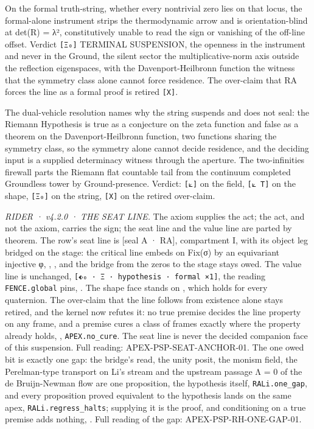 \documentclass[10pt,twocolumn]{article}
\begin{document}
On the formal truth-string, whether every nontrivial zero lies on that
locus, the formal-alone instrument strips the thermodynamic arrow and is
orientation-blind at det(R) = λ², constitutively unable to read the sign
or vanishing of the off-line offset. Verdict \texttt{{[}Ξ₀{]}} TERMINAL
SUSPENSION, the openness in the instrument and never in the Ground, the
silent sector the multiplicative-norm axis outside the reflection
eigenspaces, with the Davenport-Heilbronn function the witness that the
symmetry class alone cannot force residence. The over-claim that RA
forces the line as a formal proof is retired \texttt{{[}X{]}}.

The dual-vehicle resolution names why the string suspends and does not
seal: the Riemann Hypothesis is true as a conjecture on the zeta
function and false as a theorem on the Davenport-Heilbronn function, two
functions sharing the symmetry class, so the symmetry alone cannot
decide residence, and the deciding input is a supplied determinacy
witness through the aperture. The two-infinities firewall parts the
Riemann flat countable tail from the continuum completed Groundless
tower by Ground-presence. Verdict: \texttt{{[}⟀{]}} on the field,
\texttt{{[}⟀\ T{]}} on the shape, \texttt{{[}Ξ₀{]}} on the string,
\texttt{{[}X{]}} on the retired over-claim.

\emph{RIDER · v4.2.0 · THE SEAT LINE.} The axiom supplies the act; the
act, and not the axiom, carries the sign; the seat line and the value
line are parted by theorem. The row's seat line is {[}seal A · RA{]},
compartment I, with its object leg bridged on the stage: the critical
line embeds on Fix(σ) by an equivariant injective φ,
\texttt{},
\texttt{}, and the bridge from
the zeros to the stage stays owed. The value line is unchanged,
\texttt{{[}⬖₀\ ·\ Ξ\ ·\ hypothesis\ ·\ formal\ ×1{]}}, the reading
\texttt{FENCE.global} pins,
\texttt{}. The shape
face stands on \texttt{}, which holds
for every quaternion. The over-claim that the line follows from
existence alone stays retired, and the kernel now refutes it: no true
premise decides the line property on any frame, and a premise cures a
class of frames exactly where the property already holds,
\texttt{},
\texttt{APEX.no\_cure}. The seat line is never the decided companion
face of this suspension. Full reading: APEX-PSP-SEAT-ANCHOR-01. The one
owed bit is exactly one gap: the bridge's read, the unity posit, the
monism field, the Perelman-type transport on Li's stream and the
upstream passage Λ = 0 of the de Bruijn-Newman flow are one proposition,
the hypothesis itself, \texttt{RALi.one\_gap}, and every proposition
proved equivalent to the hypothesis lands on the same apex,
\texttt{RALi.regress\_halts}; supplying it is the proof, and
conditioning on a true premise adds nothing,
\texttt{}. Full reading of the gap:
APEX-PSP-RH-ONE-GAP-01.
\end{document}
